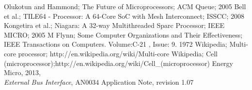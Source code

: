 \clearpage{}
\begin{thebibliography}{1}

 Olukotun and Hammond; The Future of Microprocessors; ACM Queue; 2005
 Bell et al.; TILE64 - Processor: A 64-Core SoC with Mesh Interconnect; ISSCC; 2008
 Kongetira et al.; Niagara: A 32-way Multithreaded Sparc Processor; IEEE MICRO; 2005
 M Flynn; Some Computer Organizations and Their Effectiveness; IEEE Transactions on Computers. Volume:C-21 , Issue: 9. 1972
 Wikipedia; Multi-core processor; http://en.wikipedia.org/wiki/Multi-core
 Wikipedia; Cell (microprocessor);http://en.wikipedia.org/wiki/Cell\_(microprocessor)
	Energy Micro, 2013,\\
	\textsl{External Bus Interface}, AN0034 Application Note, revision 1.07

\end{thebibliography}

